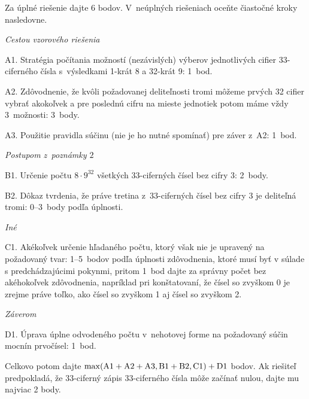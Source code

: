 {\schemaABC
Za úplné riešenie dajte 6 bodov. V~neúplných riešeniach oceňte
čiastočné kroky nasledovne.

\smallskip
\emph{Cestou vzorového riešenia}
\item{A1.} Stratégia počítania možností (nezávislých) výberov jednotlivých cifier 33-ciferného čísla s~výsledkami 1-krát 8 a 32-krát 9: 1~bod.
\item{A2.} Zdôvodnenie, že kvôli požadovanej deliteľnosti tromi môžeme prvých 32 cifier vybrať akokoľvek a pre poslednú cifru na mieste jednotiek potom máme vždy 3~možnosti: 3~body.
\item{A3.} Použitie pravidla súčinu (nie je ho nutné spomínať) pre záver z~A2: 1~bod.

\smallskip
\emph{Postupom z~poznámky $2$}
\item{B1.} Určenie počtu $8\cdot9^{32}$ všetkých 33-ciferných čísel bez cifry 3: 2~body.
\item{B2.} Dôkaz tvrdenia, že práve tretina z~33-ciferných čísel bez cifry 3 je deliteľná tromi: 0--3~body podľa úplnosti.

\smallskip
\emph{Iné}
\item{C1.} Akékoľvek určenie hľadaného počtu, ktorý však
nie je upravený na požadovaný tvar: 1--5~bodov podľa úplnosti
zdôvodnenia, ktoré musí byť v súlade s predchádzajúcimi pokynmi,
pritom 1~bod dajte za správny počet bez akéhokoľvek zdôvodnenia,
napríklad pri konštatovaní, že čísel so zvyškom 0 je zrejme
práve toľko, ako čísel so zvyškom 1 aj čísel so zvyškom 2.

\smallskip
\emph{Záverom}
\item{D1.} Úprava úplne odvodeného počtu v~nehotovej forme na požadovaný súčin mocnín prvočísel: 1~bod.

\smallskip\noindent
Celkovo potom dajte $\rm\max(A1+A2+A3,B1+B2,C1)+D1$ bodov. Ak
riešiteľ predpokladá, že 33-ciferný zápis 33-ciferného čísla môže začínať
nulou, dajte mu najviac 2 body.
\endschema
}


